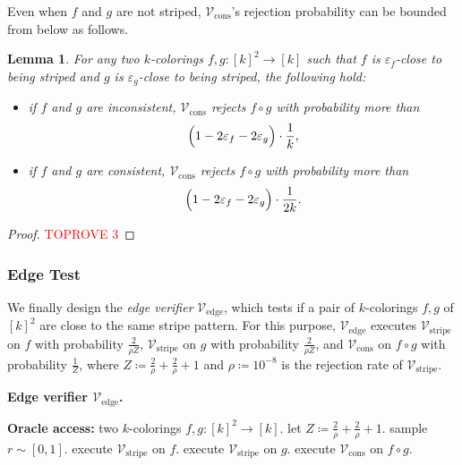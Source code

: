 \documentclass[11pt,fleqn]{article}
\renewcommand{\leq}{\leqslant}
\renewcommand{\epsilon}{\varepsilon}
\newcommand{\defeq}{\coloneq}
\newcommand{\V}{\calV}
\newcommand{\f}{f}
\newcommand{\g}{g}
\newcommand{\rhozero}{10^{-8}}
\newcommand{\Vstripe}{\V_\mathrm{stripe}}
\newcommand{\Vcons}{\V_\mathrm{cons}}
\newcommand{\Vedge}{\V_\mathrm{edge}}
\newcommand{\calV}{\mathcal{V}}
\newtheorem{lemma}[theorem]{Lemma}
\theoremstyle{definition}
\numberwithin{equation}{section}
\begin{document}
Even when $\f$ and $\g$ are not striped,
$\Vcons$'s rejection probability can be bounded from below as follows.


\begin{lemma}
\label{lem:Cut-hard:cons:far}
    For any two $k$-colorings $\f,\g \colon [k]^2 \to [k]$ such that
    $\f$ is $\epsilon_{\f}$-close to being striped and 
    $\g$ is $\epsilon_{\g}$-close to being striped,
    the following hold\textup{:}
    \begin{itemize}
    \item if $\f$ and $\g$ are inconsistent,
        $\Vcons$ rejects $\f \circ \g$ with probability more than
        \begin{align}
            \Bigl( 1-2 \epsilon_{\f} - 2\epsilon_{\g} \Bigr) \cdot \frac{1}{k},
        \end{align}
    \item if $\f$ and $\g$ are consistent,
        $\Vcons$ rejects $\f \circ \g$ with probability more than
        \begin{align}
            \Bigl( 1-2 \epsilon_{\f} - 2\epsilon_{\g} \Bigr) \cdot \frac{1}{2k}.
        \end{align}
    \end{itemize}
\end{lemma}
\begin{proof}\textcolor{red}{TOPROVE 3}\end{proof}


\subsubsection{Edge Test}
\label{sec:Cut-hard:tests:edge}


We finally design the \emph{edge verifier} $\Vedge$,
which tests if a pair of $k$-colorings $\f,\g$ of $[k]^2$ are 
close to the same stripe pattern.
For this purpose, $\Vedge$ executes
$\Vstripe$ on $\f$ with probability $\frac{2}{\rho Z}$,
$\Vstripe$ on $\g$ with probability $\frac{2}{\rho Z}$, and
$\Vcons$ on $\f \circ \g$ with probability $\frac{1}{Z}$, where
$Z \defeq \frac{2}{\rho} + \frac{2}{\rho} + 1$ and
$\rho \defeq \rhozero$ is the rejection rate of $\Vstripe$.


\begin{itembox}[l]{\textbf{Edge verifier $\Vedge$.}}
\begin{algorithmic}[1]
    \item[\textbf{Oracle access:}]
        two $k$-colorings $\f,\g \colon [k]^2 \to [k]$.
    \State let $Z \defeq \frac{2}{\rho} + \frac{2}{\rho} + 1$.
    \State sample $r \sim [0,1]$.
    \If{$0 \leq r < \frac{2}{\rho Z}$} 
        \State execute $\Vstripe$ on $\f$.
    \ElsIf{$\frac{2}{\rho Z} \leq r < \frac{2}{\rho Z} + \frac{2}{\rho Z}$} 
        \State execute $\Vstripe$ on $\g$.
    \Else {}
        \State execute $\Vcons$ on $\f \circ \g$.
    \EndIf
\end{algorithmic}
\end{itembox}
\end{document}
